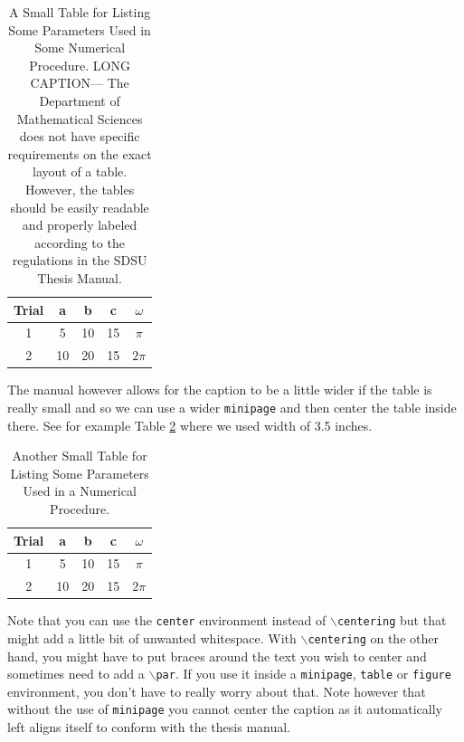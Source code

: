 \begin{table}[hbt]
  \centering
  \begin{minipage}{1.9in}
    \caption{A Small Table for Listing Some Parameters Used in Some
      Numerical Procedure\label{tab1}. LONG CAPTION--- The Department
      of Mathematical Sciences does not have specific requirements on
      the exact layout of a table. However, the tables should be
      easily readable and properly labeled according to the
      regulations in the SDSU Thesis Manual.}
    \begin{tabular}{|c||c|c|c|c||}    \hline
      Trial &	a  &  b & c & $\omega$ \\ \hline \hline
      1 & 5 & 10  & 15 & $\pi$ \\ \hline
      2 & 10 & 20  & 15 & $2\pi$ \\ \hline
    \end{tabular}
  \end{minipage}
\end{table}
% 

The manual however
allows for the caption to be a little wider if the table is really
small and so we can use a wider \texttt{minipage} and then center the
table inside there.  See for example Table \ref{wtab} where we used
width of 3.5 inches.
% 
\begin{table}[hbt]
  \centering
  \begin{minipage}{3.5in}
    \centering
    \caption{Another Small Table for Listing Some Parameters Used in a
      Numerical Procedure\label{wtab}.}
    \begin{tabular}{|c||c|c|c|c||}    \hline
      Trial &	a  &  b & c & $\omega$ \\ \hline \hline
      1 & 5 & 10  & 15 & $\pi$ \\ \hline
      2 & 10 & 20  & 15 & $2\pi$ \\ \hline
    \end{tabular}
  \end{minipage}
\end{table}

Note that you can use the \texttt{center} environment instead of
\texttt{$\backslash$centering} but that might add a little bit of
unwanted whitespace.  With \texttt{$\backslash$centering} on the other
hand, you might have to put braces around the text you wish to center
and sometimes need to add a \texttt{$\backslash$par}.  If you use it
inside a \texttt{minipage}, \texttt{table} or \texttt{figure}
environment, you don't have to really worry about that.  Note however
that without the use of \texttt{minipage} you cannot center the
caption as it automatically left aligns itself to conform with the
thesis manual.

